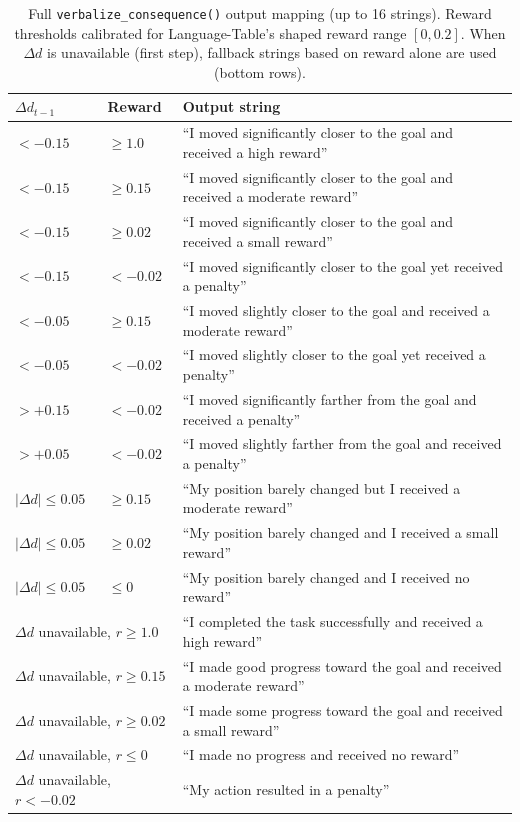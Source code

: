 \documentclass{article}
\renewcommand{\arraystretch}{1.25}
\begin{document}
\begin{table}[h]
\centering
\caption{Full \texttt{verbalize\_consequence()} output mapping (up to 16 strings).
  Reward thresholds calibrated for Language-Table's shaped reward range $[0,0.2]$.
  When $\Delta d$ is unavailable (first step), fallback strings based on reward
  alone are used (bottom rows).}
\label{tab:verbalization}
\small
\renewcommand{\arraystretch}{1.15}
\begin{tabular}{lll}
\toprule
$\Delta d_{t-1}$ & Reward & Output string \\
\midrule
$<{-}0.15$ & ${\ge}1.0$   & ``I moved significantly closer to the goal and received a high reward'' \\
$<{-}0.15$ & ${\ge}0.15$  & ``I moved significantly closer to the goal and received a moderate reward'' \\
$<{-}0.15$ & ${\ge}0.02$  & ``I moved significantly closer to the goal and received a small reward'' \\
$<{-}0.15$ & ${<}{-}0.02$ & ``I moved significantly closer to the goal yet received a penalty'' \\
$<{-}0.05$ & ${\ge}0.15$  & ``I moved slightly closer to the goal and received a moderate reward'' \\
$<{-}0.05$ & ${<}{-}0.02$ & ``I moved slightly closer to the goal yet received a penalty'' \\
$>{+}0.15$ & ${<}{-}0.02$ & ``I moved significantly farther from the goal and received a penalty'' \\
$>{+}0.05$ & ${<}{-}0.02$ & ``I moved slightly farther from the goal and received a penalty'' \\
$|\Delta d|\le0.05$ & ${\ge}0.15$ & ``My position barely changed but I received a moderate reward'' \\
$|\Delta d|\le0.05$ & ${\ge}0.02$ & ``My position barely changed and I received a small reward'' \\
$|\Delta d|\le0.05$ & ${\le}0$ & ``My position barely changed and I received no reward'' \\
\midrule
\multicolumn{2}{l}{$\Delta d$ unavailable, $r{\ge}1.0$}  & ``I completed the task successfully and received a high reward'' \\
\multicolumn{2}{l}{$\Delta d$ unavailable, $r{\ge}0.15$} & ``I made good progress toward the goal and received a moderate reward'' \\
\multicolumn{2}{l}{$\Delta d$ unavailable, $r{\ge}0.02$} & ``I made some progress toward the goal and received a small reward'' \\
\multicolumn{2}{l}{$\Delta d$ unavailable, $r{\le}0$}    & ``I made no progress and received no reward'' \\
\multicolumn{2}{l}{$\Delta d$ unavailable, $r{<}{-}0.02$}& ``My action resulted in a penalty'' \\
\bottomrule
\end{tabular}
\end{table}
\end{document}
